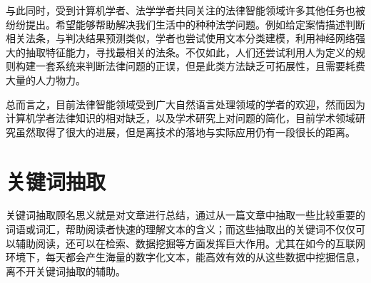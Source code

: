 


与此同时，受到计算机学者、法学学者共同关注的法律智能领域许多其他任务也被纷纷提出。希望能够帮助解决我们生活中的种种法学问题。例如给定案情描述判断相关法条，与判决结果预测类似，学者也尝试使用文本分类建模，利用神经网络强大的抽取特征能力，寻找最相关的法条。不仅如此，人们还尝试利用人为定义的规则构建一套系统来判断法律问题的正误，但是此类方法缺乏可拓展性，且需要耗费大量的人力物力。


总而言之，目前法律智能领域受到广大自然语言处理领域的学者的欢迎，然而因为计算机学者法律知识的相对缺乏，以及学术研究上对问题的简化，目前学术领域研究虽然取得了很大的进展，但是离技术的落地与实际应用仍有一段很长的距离。










\section{关键词抽取}
关键词抽取顾名思义就是对文章进行总结，通过从一篇文章中抽取一些比较重要的词语或词汇，帮助阅读者快速的理解文本的含义；而这些抽取出的关键词不仅仅可以辅助阅读，还可以在检索、数据挖掘等方面发挥巨大作用。尤其在如今的互联网环境下，每天都会产生海量的数字化文本，能高效有效的从这些数据中挖掘信息，离不开关键词抽取的辅助。

